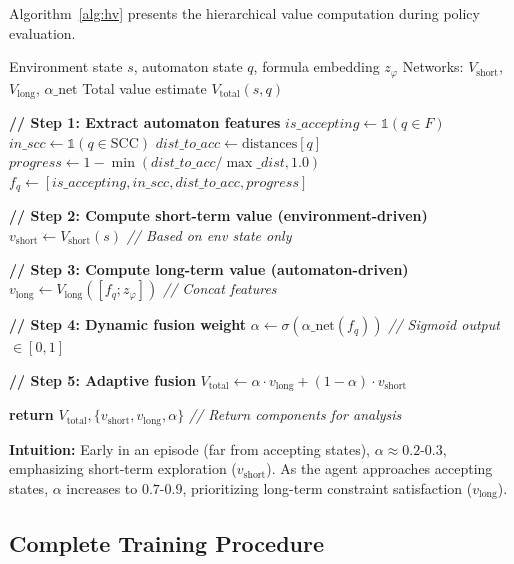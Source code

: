 \documentclass{article}
\begin{document}
Algorithm~\ref{alg:hv} presents the hierarchical value computation during policy evaluation.

\begin{algorithm}[h]
\caption{Hierarchical Value Estimation}
\label{alg:hv}
\begin{algorithmic}[1]
\REQUIRE Environment state $s$, automaton state $q$, formula embedding $z_\varphi$
\REQUIRE Networks: $V_{\text{short}}$, $V_{\text{long}}$, $\alpha\_\text{net}$
\ENSURE Total value estimate $V_{\text{total}}(s, q)$

\STATE \textbf{// Step 1: Extract automaton features}
\STATE $is\_accepting \gets \mathbb{1}(q \in F)$
\STATE $in\_scc \gets \mathbb{1}(q \in \text{SCC})$
\STATE $dist\_to\_acc \gets \text{distances}[q]$
\STATE $progress \gets 1 - \min(dist\_to\_acc / \max\_dist, 1.0)$
\STATE $f_q \gets [is\_accepting, in\_scc, dist\_to\_acc, progress]$

\STATE \textbf{// Step 2: Compute short-term value (environment-driven)}
\STATE $v_{\text{short}} \gets V_{\text{short}}(s)$ \hfill \textit{// Based on env state only}

\STATE \textbf{// Step 3: Compute long-term value (automaton-driven)}
\STATE $v_{\text{long}} \gets V_{\text{long}}([f_q; z_\varphi])$ \hfill \textit{// Concat features}

\STATE \textbf{// Step 4: Dynamic fusion weight}
\STATE $\alpha \gets \sigma(\alpha\_\text{net}(f_q))$ \hfill \textit{// Sigmoid output $\in [0, 1]$}

\STATE \textbf{// Step 5: Adaptive fusion}
\STATE $V_{\text{total}} \gets \alpha \cdot v_{\text{long}} + (1 - \alpha) \cdot v_{\text{short}}$

\STATE \textbf{return} $V_{\text{total}}, \{v_{\text{short}}, v_{\text{long}}, \alpha\}$ \hfill \textit{// Return components for analysis}
\end{algorithmic}
\end{algorithm}

\textbf{Intuition:} Early in an episode (far from accepting states), $\alpha \approx 0.2$-$0.3$, emphasizing short-term exploration ($v_{\text{short}}$). As the agent approaches accepting states, $\alpha$ increases to $0.7$-$0.9$, prioritizing long-term constraint satisfaction ($v_{\text{long}}$).

\subsection{Complete Training Procedure}
\end{document}
